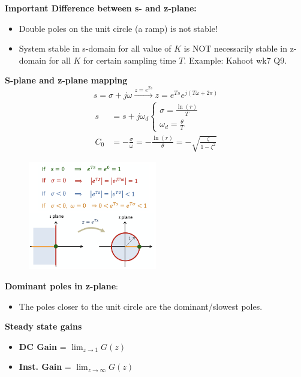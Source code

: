 \textbf{\large Important Difference between s- and z-plane:} 
\begin{itemize}
    \item Double poles on the unit circle (a ramp) is not stable!
    \item System stable in s-domain for all value of $K$ is NOT necessarily stable in z-domain for all $K$ for certain sampling time $T$. Example: Kahoot wk7 Q9.
\end{itemize}

\textbf{\large S-plane and z-plane mapping}
\begin{equation*}
    s=\sigma + j\omega \xrightarrow{z=e^{Ts}} z = e^{Ts}e^{j(T\omega + 2 \pi)}
\end{equation*}
\begin{align*}
    s &= s+ j \omega_d \begin{cases}
    \sigma = \frac{\ln(r)}{T} \\
    \omega_d = \frac{\theta}{T}
    \end{cases} \\
    C_0 &= -\frac{\sigma}{\omega} = - \frac{\ln(r)}{\theta} = -\sqrt{\frac{\zeta}{1-\zeta^2}} 
\end{align*}
\begin{figure}[H]
    \centering
    \includegraphics[width=0.5\textwidth]{images/s_z_mapping.png}
\end{figure}

\textbf{\large Dominant poles in z-plane}: 
\begin{itemize}
    \item The poles closer to the unit circle are the dominant/slowest poles.
\end{itemize}


\textbf{\large Steady state gains}
\begin{itemize}
    \item \textbf{DC Gain} = $\lim_{z\to 1} G(z)$ 
    \item \textbf{Inst. Gain} = $\lim_{z\to \infty} G(z)$
\end{itemize}

